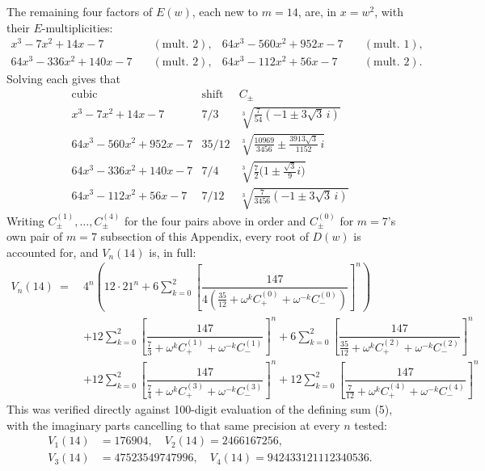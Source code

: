 \documentclass[11pt,reqno]{amsart}
\theoremstyle{remark}
\begin{document}
The remaining four factors of $E(w)$, each new to $m=14$,  are, in $x=w^2$, with their $E$-multiplicities:
\begin{align*}
x^3-7x^2+14x-7 &\quad (\text{mult. }2), &
64x^3-560x^2+952x-7 &\quad (\text{mult. }1),\\
64x^3-336x^2+140x-7 &\quad (\text{mult. }2), &
64x^3-112x^2+56x-7 &\quad (\text{mult. }2).
\end{align*}
Solving each gives that
$$
\begin{array}{c|c|c}
\text{cubic} & \text{shift} & C_\pm \\ \hline
x^3-7x^2+14x-7 & 7/3 & \sqrt[3]{\tfrac{7}{54}(-1\pm3\sqrt3\,i)}\\
64x^3-560x^2+952x-7 & 35/12 & \sqrt[3]{\tfrac{10969}{3456}\pm\tfrac{3913\sqrt3}{1152}\,i}\\
64x^3-336x^2+140x-7 & 7/4 & \sqrt[3]{\tfrac72\bigl(1\pm\tfrac{\sqrt3}{9}i\bigr)}\\
64x^3-112x^2+56x-7 & 7/12 & \sqrt[3]{\tfrac{7}{3456}(-1\pm3\sqrt3\,i)}
\end{array}
$$
Writing $C_\pm^{(1)},\dots,C_\pm^{(4)}$ for the four pairs above in order and $C_\pm^{(0)}$ for
$m=7$'s own pair of $m=7$ subsection of this Appendix, every root of $D(w)$ is accounted for, and $V_n(14)$ is, in full:
$$
\begin{aligned}
V_n(14) \ = \ & 4^n\!\left(12\cdot21^n + 6\sum_{k=0}^{2}\left[\dfrac{147}{4\left(\tfrac{35}{12}+\omega^kC_+^{(0)}+\omega^{-k}C_-^{(0)}\right)}\right]^{\!n}\right)\\[6pt]
& + 12\sum_{k=0}^{2}\left[\dfrac{147}{\tfrac{7}{3}+\omega^kC_+^{(1)}+\omega^{-k}C_-^{(1)}}\right]^{\!n}
+ 6\sum_{k=0}^{2}\left[\dfrac{147}{\tfrac{35}{12}+\omega^kC_+^{(2)}+\omega^{-k}C_-^{(2)}}\right]^{\!n}\\[6pt]
& + 12\sum_{k=0}^{2}\left[\dfrac{147}{\tfrac{7}{4}+\omega^kC_+^{(3)}+\omega^{-k}C_-^{(3)}}\right]^{\!n}
+ 12\sum_{k=0}^{2}\left[\dfrac{147}{\tfrac{7}{12}+\omega^kC_+^{(4)}+\omega^{-k}C_-^{(4)}}\right]^{\!n}
\end{aligned}
$$
This was verified directly against
100-digit evaluation of the defining sum (5), with the imaginary parts cancelling to that same
precision at every $n$ tested:
\begin{align*}
V_1(14) &= 176904, \quad V_2(14) = 2466167256,\\
V_3(14) &= 47523549747996, \quad V_4(14) = 942433121112340536.
\end{align*}
\end{document}
